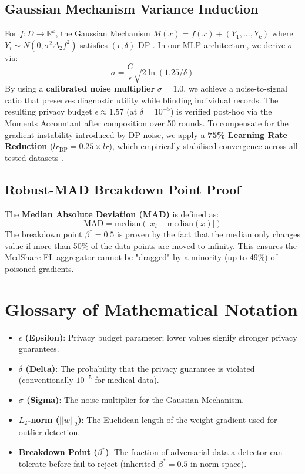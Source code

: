 \documentclass[10pt, a4paper, twocolumn]{article}
\begin{document}
\subsection*{Gaussian Mechanism Variance Induction}
For $f: D \to \mathbb{R}^k$, the Gaussian Mechanism $M(x) = f(x) + (Y_1, ..., Y_k)$ where $Y_i \sim N(0, \sigma^2 \Delta_2 f^2)$ satisfies $(\epsilon, \delta)$-DP \cite{dworkroth2014}. In our MLP architecture, we derive $\sigma$ via:
\begin{equation}
    \sigma = \frac{C}{\epsilon} \sqrt{2 \ln(1.25/\delta)}
\end{equation}
By using a \textbf{calibrated noise multiplier} $\sigma=1.0$, we achieve a noise-to-signal ratio that preserves diagnostic utility while blinding individual records. The resulting privacy budget $\epsilon \approx 1.57$ (at $\delta=10^{-5}$) is verified post-hoc via the Moments Accountant after composition over 50 rounds. To compensate for the gradient instability introduced by DP noise, we apply a \textbf{75\% Learning Rate Reduction} ($lr_{\text{DP}} = 0.25 \times lr$), which empirically stabilised convergence across all tested datasets \cite{hardt2016}.

\subsection*{Robust-MAD Breakdown Point Proof}
The \textbf{Median Absolute Deviation (MAD)} is defined as:
\begin{equation}
    \text{MAD} = \text{median}(|x_i - \text{median}(x)|)
\end{equation}
The breakdown point $\beta^* = 0.5$ is proven by the fact that the median only changes value if more than 50\% of the data points are moved to infinity. This ensures the MedShare-FL aggregator cannot be "dragged" by a minority (up to 49\%) of poisoned gradients.

\section*{Glossary of Mathematical Notation}
\begin{itemize}
    \item \textbf{$\epsilon$ (Epsilon)}: Privacy budget parameter; lower values signify stronger privacy guarantees.
    \item \textbf{$\delta$ (Delta)}: The probability that the privacy guarantee is violated (conventionally $10^{-5}$ for medical data).
    \item \textbf{$\sigma$ (Sigma)}: The noise multiplier for the Gaussian Mechanism.
    \item \textbf{$L_2$-norm ($||w||_2$)}: The Euclidean length of the weight gradient used for outlier detection.
    \item \textbf{Breakdown Point ($\beta^*$)}: The fraction of adversarial data a detector can tolerate before fail-to-reject (inherited $\beta^*=0.5$ in norm-space).
\end{itemize}
\end{document}
